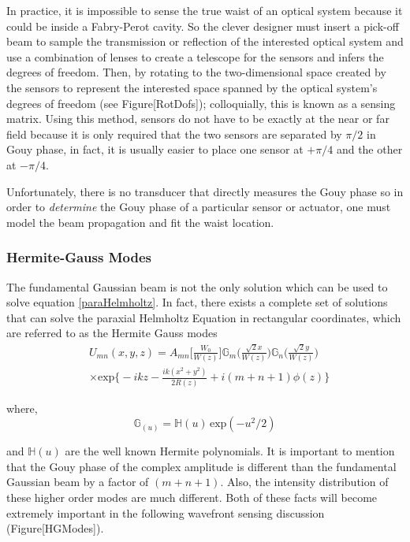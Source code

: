 		In practice, it is impossible to sense the true waist of an optical system because it could be inside a Fabry-Perot cavity.  So the clever designer must insert a pick-off beam to sample the transmission or reflection of the interested optical system and use a combination of lenses to create a telescope for the sensors and infers the degrees of freedom.  Then, by rotating to the two-dimensional space created by the sensors to represent the interested space spanned by the optical system's degrees of freedom (see Figure[RotDofs]); colloquially, this is known as a sensing matrix.  Using this method, sensors do not have to be exactly at the near or far field because it is only required that the two sensors are separated by $\pi/2$ in Gouy phase, in fact, it is usually easier to place one sensor at $+\pi/4$ and the other at $-\pi/4$. 
		
		Unfortunately, there is no transducer that directly measures the Gouy phase so in order to \textit{determine} the Gouy phase of a particular sensor or actuator, one must model the beam propagation and fit the waist location.
		
		\subsubsection{Hermite-Gauss Modes}
		The fundamental Gaussian beam is not the only solution which can be used to solve equation \ref{paraHelmholtz}.  In fact, there exists a complete set of solutions that can solve the paraxial Helmholtz Equation in rectangular coordinates, which are referred to as the Hermite Gauss modes
		\begin{equation}\label{HG}
		\begin{aligned}
		&U_{mn}(x,y,z) = A_{mn}\bigg[ \frac{W_0}{W(z)} \bigg] \mathbb{G}_m\Bigg( \frac{\sqrt{2}x}{W(z)}  \Bigg) \mathbb{G}_n\Bigg( \frac{\sqrt{2}y}{W(z)} \Bigg)\\
		&\times \text{exp} \bigg\{ -ikz - \frac{ik(x^2+y^2)}{2R(z)} + i(m+n+1)\phi(z) \bigg\}
		\end{aligned}
		\end{equation}
		
		where,
		\begin{equation}
		\mathbb{G}_(u) = \mathbb{H}(u) \, \text{exp}(-u^2/2)
		\end{equation}
		
		and $ \mathbb{H}(u)$ are the well known Hermite polynomials.  It is important to mention that the Gouy phase of the complex amplitude is different than the fundamental Gaussian beam by a factor of $(m + n + 1)$.   Also, the intensity distribution of these higher order modes are much different. Both of these facts will become extremely important in the following wavefront sensing discussion (Figure[HGModes]).
		
